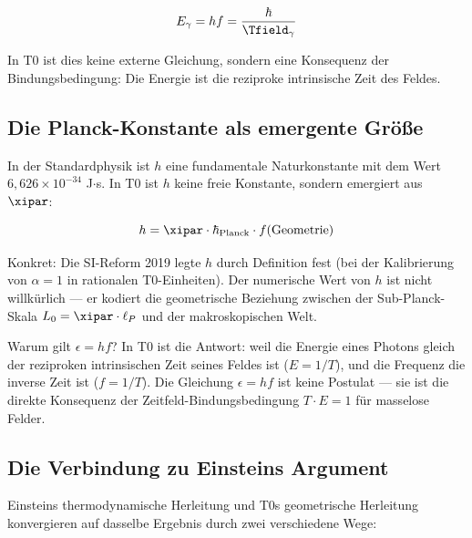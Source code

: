\begin{equation}
    E_\gamma = hf = \frac{\hbar}{\Tfield_\gamma}
    \label{eq:photon_energy_t0}
\end{equation}

In T0 ist dies keine externe Gleichung, sondern eine Konsequenz der Bindungsbedingung: 
Die Energie ist die reziproke intrinsische Zeit des Feldes.

\subsection{Die Planck-Konstante als emergente Größe}

In der Standardphysik ist $h$ eine fundamentale Naturkonstante mit dem Wert 
$6{,}626 \times 10^{-34}$ J$\cdot$s. In T0 ist $h$ keine freie Konstante, 
sondern emergiert aus $\xipar$:

\begin{equation}
    h = \xipar \cdot \hbar_{\text{Planck}} \cdot f(\text{Geometrie})
    \label{eq:h_from_xi}
\end{equation}

Konkret: Die SI-Reform 2019 legte $h$ durch Definition fest (bei der Kalibrierung 
von $\alpha = 1$ in rationalen T0-Einheiten). Der numerische Wert von $h$ ist 
nicht willkürlich — er kodiert die geometrische Beziehung zwischen der 
Sub-Planck-Skala $L_0 = \xipar \cdot \ell_P$ und der makroskopischen Welt.

\begin{keyresult}
    Warum gilt $\epsilon = hf$? In T0 ist die Antwort: weil die Energie eines Photons 
    gleich der reziproken intrinsischen Zeit seines Feldes ist ($E = 1/T$), und die 
    Frequenz die inverse Zeit ist ($f = 1/T$). Die Gleichung $\epsilon = hf$ ist keine 
    Postulat — sie ist die direkte Konsequenz der Zeitfeld-Bindungsbedingung 
    $T \cdot E = 1$ für masselose Felder.
\end{keyresult}

\subsection{Die Verbindung zu Einsteins Argument}

Einsteins thermodynamische Herleitung und T0s geometrische Herleitung konvergieren 
auf dasselbe Ergebnis durch zwei verschiedene Wege:

